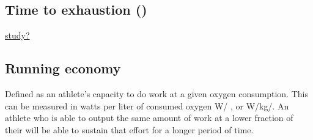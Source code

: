 \subsection{Time to exhaustion (\tex)}\cn
\hyperref[https://link.springer.com/article/10.1007/s11332-019-00585-7]{study?}
\subsection{Running economy}
Defined as an athlete's capacity to do work at a given oxygen consumption. This can be measured in watts per liter of consumed oxygen \si{W/\vot} \cite[9]{dominguez2017effects}, or \si{W/kg/\vot}. An athlete who is able to output the same amount of work at a lower fraction of their \votmax{} will be able to sustain that effort for a longer period of time.

\fi